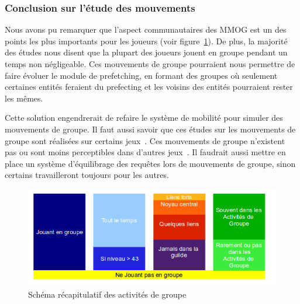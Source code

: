 \subsubsection{Conclusion sur l'étude des mouvements}
Nous avons pu remarquer que l'aspect communautaires des MMOG est un des points les plus importants pour les joueurs (voir figure~\ref{recapstat}). De plus, la majorité des études nous disent que la plupart des joueurs jouent en groupe pendant un temps non négligeable. Ces mouvements de groupe pourraient nous permettre de faire évoluer le module de prefetching, en formant des groupes où seulement certaines entités feraient du prefecting et les voisins des entités pourraient rester les mêmes.
\par Cette solution engendrerait de refaire le système de mobilité pour simuler des mouvements de groupe. Il faut aussi savoir que ces études sur les mouvements de groupe sont réalisées sur certains jeux~\cite{wow,everquest}. Ces mouvements de groupe n'existent pas ou sont moins perceptibles dans d'autres jeux~\cite{sl}. Il faudrait aussi mettre en place un système d'équilibrage des requêtes lors de mouvements de groupe, sinon certains travailleront toujours pour les autres.

	\vspace{5cm}
	\begin{figure}[!h]
        \centering
        \includegraphics[scale=0.65]{./Ressources/Images/recapstat.png}
        \caption{Schéma récapitulatif des activités de groupe}
        \label{recapstat}
        \end{figure}

